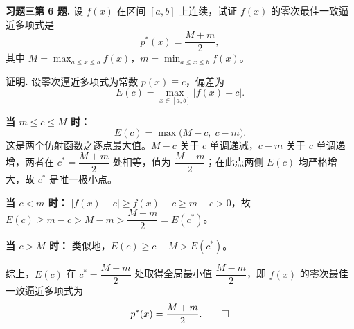 \documentclass[UTF8,a4paper,11pt]{ctexart}
\newcommand*{\QED}{\hfill\ensuremath{\square}}
\begin{document}
\bigskip\bigskip

\noindent\textbf{习题三\quad 第 6 题.}\quad
设 $f(x)$ 在区间 $[a,b]$ 上连续，试证 $f(x)$ 的零次最佳一致逼近多项式是
\[
  p^*(x)=\frac{M+m}{2},
\]
其中 $M=\max_{a\leqslant x\leqslant b}f(x)$，$m=\min_{a\leqslant x\leqslant b}f(x)$。

\medskip
\noindent\textbf{证明.}\quad
设零次逼近多项式为常数 $p(x)\equiv c$，偏差为
\[
  E(c)=\max_{x\in[a,b]}\bigl|f(x)-c\bigr|.
\]

\noindent\textbf{当 $m\leqslant c\leqslant M$ 时：}
\[
  E(c)=\max\!\bigl(M-c,\;c-m\bigr).
\]
这是两个仿射函数之逐点最大值。$M-c$ 关于 $c$ 单调递减，$c-m$ 关于 $c$ 单调递增，两者在 $c^*=\dfrac{M+m}{2}$ 处相等，值为 $\dfrac{M-m}{2}$；在此点两侧 $E(c)$ 均严格增大，故 $c^*$ 是唯一极小点。

\noindent\textbf{当 $c<m$ 时：}
$|f(x)-c|\geqslant f(x)-c\geqslant m-c>0$，故
$E(c)\geqslant m-c>M-m>\dfrac{M-m}{2}=E(c^*)$。

\noindent\textbf{当 $c>M$ 时：}
类似地，$E(c)\geqslant c-M>E(c^*)$。

综上，$E(c)$ 在 $c^*=\dfrac{M+m}{2}$ 处取得全局最小值 $\dfrac{M-m}{2}$，即 $f(x)$ 的零次最佳一致逼近多项式为
\[
  p^*(x)=\frac{M+m}{2}.\qquad\QED
\]
\end{document}
